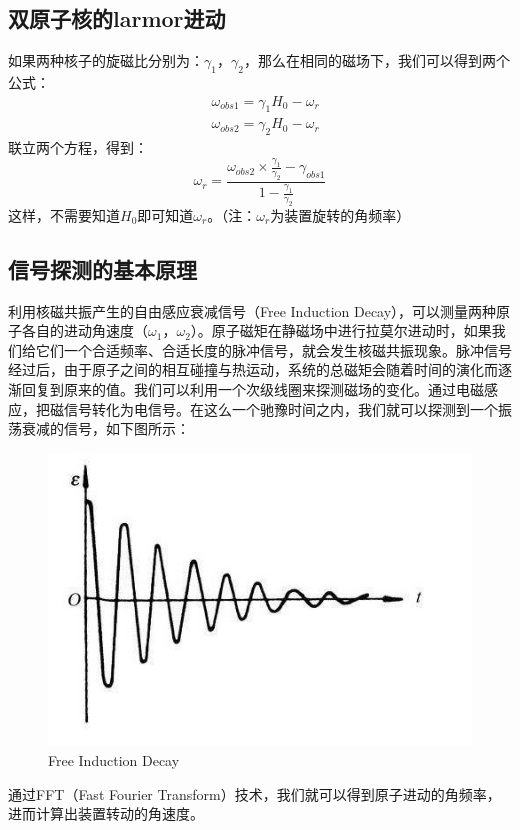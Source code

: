 \subsection{双原子核的larmor进动\cite{5}}
如果两种核子的旋磁比分别为：$\gamma_1$，$\gamma_2$，那么在相同的磁场下，我们可以得到两个公式：
\begin{equation}
\begin{aligned}
&\omega_{obs1}=\gamma_{1}H_{0}-\omega_{r}\\
&\omega_{obs2}=\gamma_{2}H_{0}-\omega_{r}
\end{aligned}
\end{equation}
联立两个方程，得到：
\begin{equation}
\omega_r=\frac{\omega_{obs2}\times\frac{\gamma_1}{\gamma_2} -\gamma_{obs1}}{1-\frac{\gamma_1}{\gamma_2} }
\end{equation}
这样，不需要知道$H_0$即可知道$\omega _r$。（注：$\omega _r$为装置旋转的角频率）
\subsection{信号探测的基本原理}
利用核磁共振产生的自由感应衰减信号（Free Induction Decay），可以测量两种原子各自的进动角速度（$\omega_1$，$\omega_2$）。原子磁矩在静磁场中进行拉莫尔进动时，如果我们给它们一个合适频率、合适长度的脉冲信号，就会发生核磁共振现象。脉冲信号经过后，由于原子之间的相互碰撞与热运动，系统的总磁矩会随着时间的演化而逐渐回复到原来的值。我们可以利用一个次级线圈来探测磁场的变化。通过电磁感应，把磁信号转化为电信号。在这么一个驰豫时间之内，我们就可以探测到一个振荡衰减的信号，如下图所示：
\begin{figure}[H]
	\centering
	\includegraphics[width=\linewidth]{FID.jpg}
	\caption{Free Induction Decay}
	\label{fig:results}
\end{figure}
\par 通过FFT（Fast Fourier Transform）技术，我们就可以得到原子进动的角频率，进而计算出装置转动的角速度。
